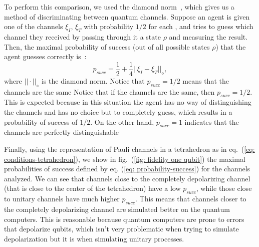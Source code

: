 \documentclass[10pt,letterpaper]{article} %
\begin{document}
To perform this comparison, we used the diamond norm~\cite{Aharonov,Wilde},
which gives us a method of discriminating   between quantum channels.
Suppose an agent is given one of the channels $\xi_I$, $\xi_T$
with probability $1/2$ for each 
 ,
and tries to guess which channel they received
by passing through it a state $\rho$ and measuring the result.
Then, the maximal probability of success (out of all possible states $\rho$) that
the agent guesses correctly is~\cite{Benenti}:
\begin{equation}
\label{eq: probability-success}
p_{succ} = \dfrac{1}{2}+ \dfrac{1}{4} ||\xi_I - \xi_T ||_{\diamond},
\end{equation}
where $|| \cdot ||_{\diamond}$ is the diamond norm.  Notice that $p_{succ}=1/2$
means that the channels are the same 
 {\color{orange} Notice that if the channels are the same, then $p_{succ}=1/2$. 
This is expected because in this situation the agent
has no way of distinguishing the channels and has no choice but to completely
guess, which results in a probability of success of $1/2$.}
On the other hand, $p_{succ}=1$ indicates that the channels are perfectly
distinguishable  

Finally, using the representation of Pauli channels in a tetrahedron as
in eq.~(\ref{eq: conditions-tetrahedron}),
we show in fig.~(\ref{fig: fidelity one qubit}) the maximal probabilities of
success defined by eq. (\ref{eq: probability-success}) for the channels
analyzed.  
 {\color{orange} We can see that channels close to the 
completely depolarizing
channel (that is close to the center of the tetrahedron)
have a low $p_{succ}$, while those 
close to unitary channels have much higher $p_{succ}$.
This means that channels closer to the 
completely depolarizing channel are simulated better on the quantum computers.
This is reasonable because quantum computers are prone to errors
that depolarize qubits, which isn't very problematic
when trying to simulate depolarization but it is 
when simulating unitary processes.}
\end{document}
